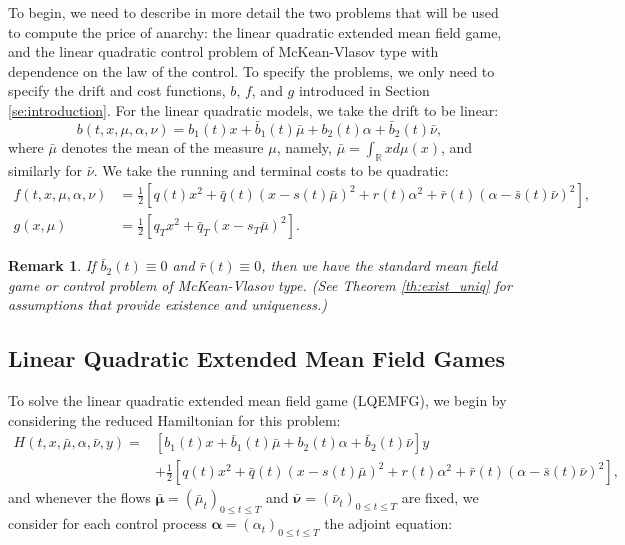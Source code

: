 \documentclass[11pt]{article}
\newtheorem{remark}{Remark}
\def\balpha{\boldsymbol{\alpha}}
\def\bmubar{\boldsymbol{\bar{\mu}}}
\def\bnubar{\boldsymbol{\bar{\nu}}}
\begin{document}
To begin, we need to describe in more detail the two problems that will be used to compute the price of anarchy: the linear quadratic extended mean field game, and the linear quadratic control problem of McKean-Vlasov type with dependence on the law of the control. To specify the problems, we only need to specify the drift and cost functions, $b$, $f$, and $g$ introduced in Section \ref{se:introduction}. For the linear quadratic models, we take the drift to be linear:
\begin{equation*}
    b(t,x,\mu,\alpha,\nu)=b_1(t)x+\bar{b}_1(t) \bar{\mu}+b_2(t) \alpha+\bar{b}_2(t) \bar{\nu},
\end{equation*}
where $\bar{\mu}$ denotes the mean of the measure $\mu$, namely, $\bar{\mu}=\int_{\mathbb{R}}xd\mu(x)$, and similarly for $\bar{\nu}$. We take the running and terminal costs to be quadratic:
\begin{equation*}
\begin{split}
    f(t,x,\mu,\alpha,\nu)&=\frac{1}{2}\left[q(t)x^2+\bar{q}(t)(x-s(t)\bar{\mu})^2 +r(t)\alpha^2+\bar{r}(t)(\alpha-\bar{s}(t)\bar{\nu})^2\right], \\
    g(x,\mu)&=\frac{1}{2}\left[q_T x^2+\bar{q}_T (x-s_T \bar{\mu})^2\right].
\end{split}
\end{equation*}
\begin{remark}
If $\bar{b}_2(t)\equiv0$ and $\bar{r}(t)\equiv0$, then we have the standard mean field game or control problem of McKean-Vlasov type. (See Theorem \ref{th:exist_uniq} for assumptions that provide existence and uniqueness.)
\end{remark}

\subsection{\textbf{Linear Quadratic Extended Mean Field Games}}\label{sec:EMFG}
To solve the linear quadratic extended mean field game (LQEMFG), we begin by considering the reduced Hamiltonian for this problem:
\begin{equation*}
\begin{split}
    H(t,x,\bar{\mu},\alpha,\bar{\nu},y)=&\left[b_1(t)x+\bar{b}_1(t)\bar{\mu}+b_2(t) \alpha+\bar{b}_2(t)\bar{\nu}\right]y \\
    &+\frac{1}{2}\left[q(t)x^2+\bar{q}(t)(x-s(t)\bar{\mu})^2 +r(t)\alpha^2+\bar{r}(t)(\alpha-\bar{s}(t)\bar{\nu})^2\right],
\end{split}
\end{equation*}
and whenever the flows $\bmubar=(\bar{\mu}_t)_{0\leq t\leq T}$ and $\bnubar=(\bar{\nu}_t)_{0\leq t\leq T}$ are fixed, we consider for each control process $\balpha=(\alpha_t)_{0\leq t\leq T}$ the adjoint equation:
\end{document}
